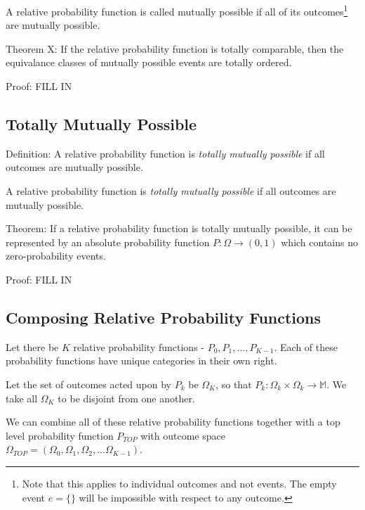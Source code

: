 \documentclass[twoside]{article}
\begin{document}
A relative probability function is called mutually possible if all of its outcomes\footnote{Note that this applies to individual outcomes and not events. The empty event \(e = \{\}\) will be impossible with respect to any outcome.} are mutually possible.

Theorem X: If the relative probability function is totally comparable, then the equivalance classes of mutually possible events are totally ordered.

Proof: FILL IN

\subsection{Totally Mutually Possible}

Definition: A relative probability function is \textit{totally mutually possible} if all outcomes are mutually possible.

A relative probability function is \textit{totally mutually possible} if all outcomes are mutually possible.

Theorem: If a relative probability function is totally mutually possible, it can be represented by an absolute probability function \(P: \Omega \rightarrow (0, 1)\) which contains no zero-probability events.

Proof: FILL IN


\subsection{Composing Relative Probability Functions}

Let there be \(K\) relative probability functions - \(P_0, P_1, ..., P_{K-1}\). Each of these probability functions have unique categories in their own right.

Let the set of outcomes acted upon by \(P_k\) be \(\Omega_K\), so that \(P_k: \Omega_k \times \Omega_k \rightarrow \mathbb{M}\). We take all \(\Omega_K\) to be disjoint from one another.

We can combine all of these relative probability functions together with a top level probability function \(P_{TOP}\) with outcome space \(\Omega_{TOP} = (\Omega_0, \Omega_1, \Omega_2, ... \Omega_{K- 1})\).

\end{document}
